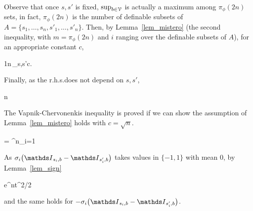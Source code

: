 \documentclass[scombinatorics.tex]{subfiles}
\begin{document}
Observe that once $s,s'$ is fixed, $\sup_{b\in\EuScript V}$ is actually a maximum among $\pi_\phi(2n)$ sets, in fact, $\pi_\phi(2n)$ is the number of definable subsets of $A=\{s_1,\dots,s_n,s'_1,\dots,s'_n\}$.
Then, by Lemma~\ref{lem_mistero} (the second inequality, with $m =\pi_\phi(2n)$ and $i$ ranging over the definable subsets of $A$), for an appropriate constant $c$,

\ceq{}
{\le}
{\frac1n\,\sup_{s,s'}c.}

Finally, as the r.h.s.\@ does not depend on $s,s'$,

\ceq{}
{\le}
{n}

The Vapnik-Chervonenkis inequality is proved if we can show the assumption of Lemma~\ref{lem_mistero} holds with $c=\sqrt{n}$.

\ceq{\hfill\Ex\bigg[\exp\bigg(t\sum^n_{i=1} \sigma_i\big(\Indicator_{s_i,b} -  \Indicator_{s'_i,b}\big)\bigg)\bigg]}
{=}
{\prod^n_{i=1} \Ex{}}

As $\sigma_i\big(\Indicator_{s_i,b} -  \Indicator_{s'_i,b}\big)$ takes values in $\{-1,1\}$ with mean $0$, by Lemma~\ref{lem_sign}

\ceq{}
{\le}
{e^{nt^2/2}}

and the same holds for $-\sigma_i\big(\Indicator_{s_i,b} -  \Indicator_{s'_i,b}\big)$.\QED
\end{document}
